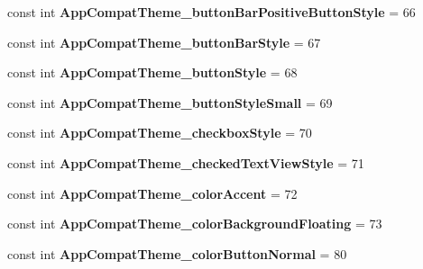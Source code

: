 \begin{DoxyCompactItemize}
const int {\bfseries App\+Compat\+Theme\+\_\+button\+Bar\+Positive\+Button\+Style} = 66
\item 
\mbox{\label{classst_delivery_1_1_resource_1_1_styleable_ab09d81e2f9ce6af2ca538768b0a1d84c}} 
const int {\bfseries App\+Compat\+Theme\+\_\+button\+Bar\+Style} = 67
\item 
\mbox{\label{classst_delivery_1_1_resource_1_1_styleable_ac85c5b540a22ea84b6c0643ed9d34269}} 
const int {\bfseries App\+Compat\+Theme\+\_\+button\+Style} = 68
\item 
\mbox{\label{classst_delivery_1_1_resource_1_1_styleable_a058106196a9b29fc02f64f8cce252ffa}} 
const int {\bfseries App\+Compat\+Theme\+\_\+button\+Style\+Small} = 69
\item 
\mbox{\label{classst_delivery_1_1_resource_1_1_styleable_a6b3e013f960f4bf4f94066a6155c421f}} 
const int {\bfseries App\+Compat\+Theme\+\_\+checkbox\+Style} = 70
\item 
\mbox{\label{classst_delivery_1_1_resource_1_1_styleable_a0aa754fb128e2e9982ad21119550c2a4}} 
const int {\bfseries App\+Compat\+Theme\+\_\+checked\+Text\+View\+Style} = 71
\item 
\mbox{\label{classst_delivery_1_1_resource_1_1_styleable_a319a0abc18c596b7ab76bbd50315770d}} 
const int {\bfseries App\+Compat\+Theme\+\_\+color\+Accent} = 72
\item 
\mbox{\label{classst_delivery_1_1_resource_1_1_styleable_a4ffc0a7742d65f4f81a3147ce6cda1d9}} 
const int {\bfseries App\+Compat\+Theme\+\_\+color\+Background\+Floating} = 73
\item 
\mbox{\label{classst_delivery_1_1_resource_1_1_styleable_a420a7b1cdef7b67b5ec4d852b1a477b3}} 
const int {\bfseries App\+Compat\+Theme\+\_\+color\+Button\+Normal} = 80
\item 
\mbox{\label{classst_delivery_1_1_resource_1_1_styleable_ae1ab75443fb6ba900ea784e6b0f15017}} 

\end{DoxyCompactItemize}
